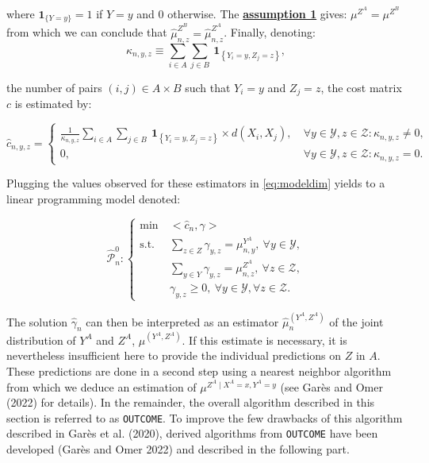 where \(\mathbf{1}_{\{Y = y\}}=1\) if \(Y=y\) and \(0\) otherwise. The \protect\hyperlink{optt}{\textbf{assumption 1}} gives: \({\mu}^{Z^A}={\mu}^{Z^B}\) from which we can conclude that \(\hat{\mu}^{Z^B}_{n,z}=\hat{\mu}^{Z^A}_{n,z}\).
Finally, denoting: \[\kappa_{n,y,z}\equiv \sum_{i\in A} \sum_{j\in B}~ \mathbf{1}_{\left\{Y_i=y,Z_j=z\right\}},\]

the number of pairs \((i,j)\in A\times B\) such that \(Y_i=y\) and \(Z_j=z\), the cost matrix \(c\) is estimated by:

\begin{equation}
\hat{c}_{n,y,z}=\left\{ \begin{array}{ll} \frac{1}{\kappa_{n,y,z}}\sum_{i\in A} \sum_{j\in B}~ \mathbf{1}_{\left\{Y_i=y,Z_j=z\right\}} \times d(X_i,X_j), & \: \forall y\in \mathcal{Y}, z\in\mathcal{Z}:\kappa_{n,y,z}\neq 0,\\
 0, & \:\forall y \in \mathcal{Y}, z \in \mathcal{Z}:\kappa_{n,y,z} = 0.
\end{array}\right.
\label{eq:cost}
\end{equation}

Plugging the values observed for these estimators in \eqref{eq:modeldim} yields to a linear programming model denoted:

\begin{equation}
\hat{\mathcal{P}}^0_n: \left\{
    \begin{aligned}
         \min\: & <\widehat{c}_n,\gamma>\\
                \text{s.t.}\:& \sum_{z\in Z} \gamma_{y,z} = \mu^{Y^A}_{n,y}, \:\forall y\in \mathcal{Y}, \\
                & \sum_{y\in Y} \gamma_{y,z} = \mu^{Z^A}_{n,z}, \:\forall z\in \mathcal{Z}, \\
                & \gamma_{y,z} \geq 0, \: \forall y\in \mathcal{Y}, \forall z\in \mathcal{Z}.
    \end{aligned}\right.
    \label{eq:outco}
\end{equation}

The solution \(\hat{\gamma}_n\) can then be interpreted as an estimator \(\hat{\mu}^{(Y^A,Z^A)}_n\) of the joint distribution of \(Y^A\) and \(Z^A\), \(\mu^{(Y^A,Z^A)}\). If this estimate is necessary, it is nevertheless insufficient here to provide the individual predictions on \(Z\) in \(A\). These predictions are done in a second step using a nearest neighbor algorithm from which we deduce an estimation of \(\mu^{Z^A\mid X^A=x,Y^A=y}\) (see Garès and Omer (2022) for details). In the remainder, the overall algorithm described in this section is referred to as \texttt{OUTCOME}. To improve the few drawbacks of this algorithm described in Garès et al. (2020), derived algorithms from \texttt{OUTCOME} have been developed (Garès and Omer 2022) and described in the following part.

